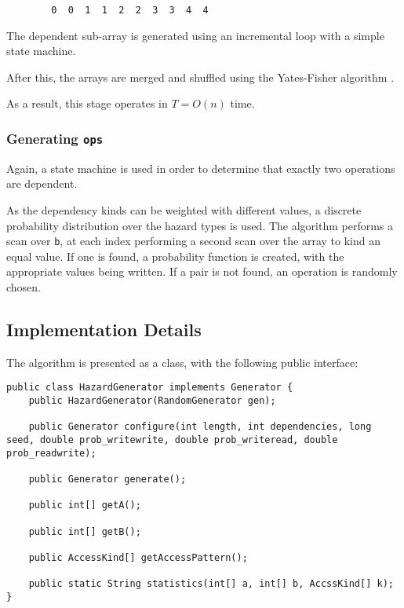 		\begin{verbatim}
		0  0  1  1  2  2  3  3  4  4
		\end{verbatim}
		
		The dependent sub-array is generated using an incremental loop with a simple state machine.
		
		After this, the arrays are merged and shuffled using the Yates-Fisher algorithm \citep[p.~145]{TAOCPvol2}.
		
		As a result, this stage operates in $T=O(n)$ time.
		
		\subsubsection{Generating \texttt{ops}} \label{sec:methodology/params/algo/gen-ops}
		Again, a state machine is used in order to determine that exactly two operations are dependent.
		
		As the dependency kinds can be weighted with different values, a discrete probability distribution over the hazard types is used. The algorithm performs a scan over \texttt{b}, at each index performing a second scan over the array to kind an equal value. If one is found, a probability function is created, with the appropriate values being written. If a pair is not found, an operation is randomly chosen.
	
	\subsection{Implementation Details} \label{sec:methodology/params/implementation}
	The algorithm is presented as a class, with the following public interface:
	
	\begin{lstlisting}
public class HazardGenerator implements Generator {
	public HazardGenerator(RandomGenerator gen);
	
	public Generator configure(int length, int dependencies, long seed, double prob_writewrite, double prob_writeread, double prob_readwrite);
	
	public Generator generate();
	
	public int[] getA();
	
	public int[] getB();
	
	public AccessKind[] getAccessPattern();
	
	public static String statistics(int[] a, int[] b, AccssKind[] k);
}\end{lstlisting}


